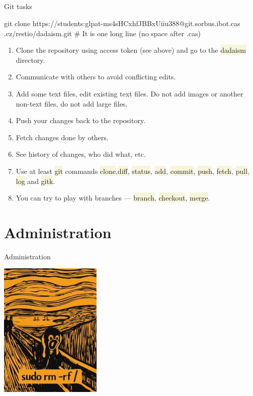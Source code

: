 \documentclass[compress, xelatex, 11pt, xcolor=svgnames, aspectratio=169,
	hyperref={
		bookmarks=true,
		unicode=true,
		colorlinks=true,
		pdftitle={Linux, command line and MetaCentrum},
		plainpages=false,
		pdfauthor={Vojtech Zeisek},
		pdfsubject={Course about use of Linux command line, writing shell scripts and using MetaCentrum of CESNET},
		pdfcreator={XeLaTeX},
		pdfkeywords={Linux, GNU, BASH, shell, command line, MetaCentrum},
		linkcolor=DarkRed, %
		anchorcolor=DarkBlue, %
		citecolor=Indigo, %
		filecolor=NavyBlue, %
		menucolor=DarkMagenta, %
		urlcolor=DarkBlue, %
		},
	url={hyphens, lowtilde} %
	]{beamer}
\renewcommand{\texttt}[1]{\colorbox{Beige}{{\ttfamily #1}}}
\begin{document}
\subsection{}

\begin{frame}[fragile]{Git tasks}
	\begin{bashcode}
    git clone https://students:glpat-ms4sHCxhfJBBxUiiu388@git.sorbus.ibot.cas
      .cz/restio/dadaism.git # It is one long line (no space after .cas)
	\end{bashcode}
	\begin{enumerate}
		\item Clone the repository using access token (see above) and go to the \texttt{dadaism} directory.
		\item Communicate with others to avoid conflicting edits.
		\item Add some text files, edit existing text files. Do not add images or another non-text files, do not add large files.
		\item Push your changes back to the repository.
		\item Fetch changes done by others.
		\item See history of changes, who did what, etc.
		\item Use at least \texttt{git} commands \texttt{clone},\texttt{diff}, \texttt{status}, \texttt{add}, \texttt{commit}, \texttt{push}, \texttt{fetch}, \texttt{pull}, \texttt{log} and \texttt{gitk}.
		\item You can try to play with branches --- \texttt{branch}, \texttt{checkout}, \texttt{merge}.
	\end{enumerate}
\end{frame}

\section{Administration}

\begin{frame}{Administration}
	\begin{multicols}{2}
		\tableofcontents[currentsection, sectionstyle=show/hide, hideothersubsections]
		\columnbreak
		\begin{center}
			\includegraphics[height=6.5cm]{rmrf.jpg}
		\end{center}
	\end{multicols}
\end{frame}
\end{document}

